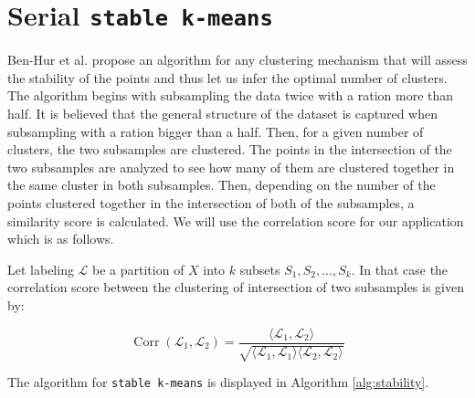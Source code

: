 \documentclass[10pt,twocolumn,letterpaper]{article}
\DeclareMathOperator{\Corr}{Corr}
\begin{document}
\section{Serial \texttt{stable k-means}} \label{section:stable}


Ben-Hur et al. \cite{ben2001} propose an algorithm for any clustering mechanism that will assess the stability of the points and thus let us infer the optimal number of clusters. The algorithm begins with subsampling the data twice with a ration more than half. It is believed that the general structure of the dataset is captured when subsampling with a ration bigger than a half. Then, for a given number of clusters, the two subsamples are clustered. The points in the intersection of the two subsamples are analyzed to see how many of them are clustered together in the same cluster in both subsamples. Then, depending on the number of the points clustered together in the intersection of both of the subsamples, a similarity score is calculated. We will use the correlation score for our application which is as follows.

Let labeling $\mathcal{L}$ be a partition of $X$ into $k$ subsets $S_1, S_2, ... , S_k$. In that case the correlation score between the clustering of intersection of two subsamples is given by: 

\[
\Corr(\mathcal{L}_1, \mathcal{L}_2) = \frac{\langle \mathcal{L}_1, \mathcal{L}_2 \rangle}{\sqrt{\langle \mathcal{L}_1,\mathcal{L}_1\rangle \langle \mathcal{L}_2,\mathcal{L}_2\rangle}}
\]

The algorithm for \texttt{stable k-means} is displayed in Algorithm \ref{alg:stability}.
\end{document}
